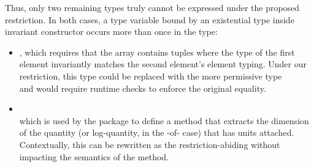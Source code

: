 Thus, only two remaining types truly cannot be expressed under
the proposed restriction. In both cases, a type variable bound by an existential
type inside invariant constructor occurs more than once in the type:
\begin{itemize}
  \item {}, which requires that the array
  contains tuples where the type of the first element invariantly matches the second element's element typing.
  Under our restriction, this type could be replaced with the more permissive 
  type\\  and
  would require runtime checks to enforce the original equality.
  \item
  \\
  which is used by the  package to define a method that extracts the dimension  of the
  quantity (or log-quantity, in the -of- case) that has units attached. Contextually,
  this can be %
  rewritten as the restriction-abiding
  without %
  impacting the semantics of the method.
\end{itemize}





